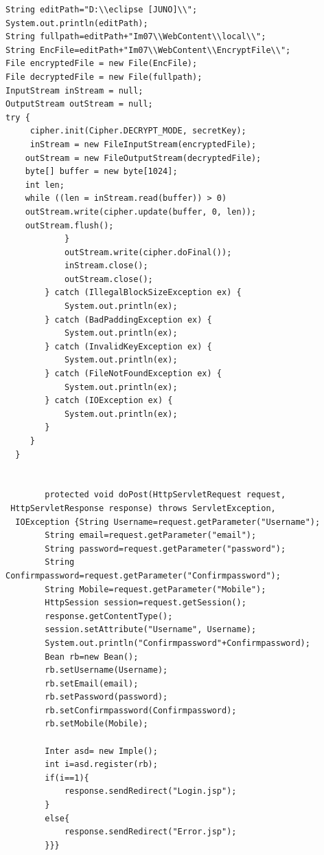 \documentclass[BTech]{srmuthesis}
\begin{document}
\begin{verbatim}
String editPath="D:\\eclipse [JUNO]\\";
System.out.println(editPath);
String fullpath=editPath+"Im07\\WebContent\\local\\";
String EncFile=editPath+"Im07\\WebContent\\EncryptFile\\";
File encryptedFile = new File(EncFile);
File decryptedFile = new File(fullpath);
InputStream inStream = null;
OutputStream outStream = null;
try {
     cipher.init(Cipher.DECRYPT_MODE, secretKey);
     inStream = new FileInputStream(encryptedFile);
    outStream = new FileOutputStream(decryptedFile);
    byte[] buffer = new byte[1024];
    int len;
    while ((len = inStream.read(buffer)) > 0) 
    outStream.write(cipher.update(buffer, 0, len));
    outStream.flush();
            }
            outStream.write(cipher.doFinal());
            inStream.close();
            outStream.close();
        } catch (IllegalBlockSizeException ex) {
            System.out.println(ex);
        } catch (BadPaddingException ex) {
            System.out.println(ex);
        } catch (InvalidKeyException ex) {
            System.out.println(ex);
        } catch (FileNotFoundException ex) {
            System.out.println(ex);
        } catch (IOException ex) {
            System.out.println(ex);
        }
     }
  }
        
        
        protected void doPost(HttpServletRequest request,
 HttpServletResponse response) throws ServletException,
  IOException {String Username=request.getParameter("Username");
		String email=request.getParameter("email");
		String password=request.getParameter("password");
		String Confirmpassword=request.getParameter("Confirmpassword");
		String Mobile=request.getParameter("Mobile");
		HttpSession session=request.getSession();
		response.getContentType();
		session.setAttribute("Username", Username);
		System.out.println("Confirmpassword"+Confirmpassword);
		Bean rb=new Bean();
		rb.setUsername(Username);
		rb.setEmail(email);
		rb.setPassword(password);
		rb.setConfirmpassword(Confirmpassword);
		rb.setMobile(Mobile);
		
		Inter asd= new Imple();
		int i=asd.register(rb);
		if(i==1){
			response.sendRedirect("Login.jsp");
		}                          
		else{
			response.sendRedirect("Error.jsp");
		}}}
\end{verbatim}
\end{document}
